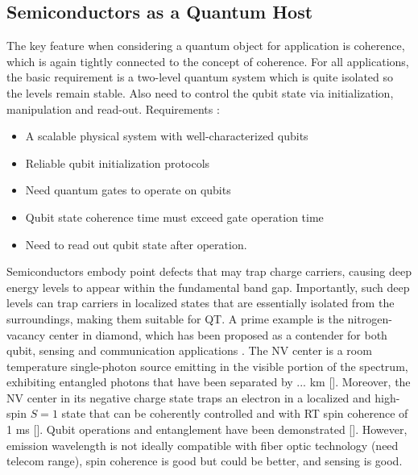 \documentclass[superscriptaddress,unsortedaddress,
 amsmath,amssymb,
 aps,
]{revtex4-2}
\begin{document}
\subsection*{Semiconductors as a Quantum Host} %
The key feature when considering a quantum object for application is coherence, which is again tightly connected to the concept of coherence. 
For all applications, the basic requirement is a two-level quantum system which is quite isolated so the levels remain stable. 
Also need to control the qubit state via initialization, manipulation and read-out. 
Requirements \cite{DiVincenzo2000,Weber2010}: 
\begin{itemize}
    \item A scalable physical system with well-characterized qubits
    \item Reliable qubit initialization protocols 
    \item Need quantum gates to operate on qubits 
    \item Qubit state coherence time must exceed gate operation time 
    \item Need to read out qubit state after operation. 
\end{itemize}

Semiconductors embody point defects that may trap charge carriers, causing deep energy levels to appear within the fundamental band gap. 
Importantly, such deep levels can trap carriers in localized states that are essentially isolated from the surroundings, making them suitable for QT. 
A prime example is the nitrogen-vacancy center in diamond, which has been proposed 
as a contender for both qubit, sensing and communication applications \cite{Doherty_2013}. 
The NV center is a room temperature single-photon source emitting in the visible portion of the spectrum, exhibiting entangled photons that have been separated by ... km []. 
Moreover, the NV center in its negative charge state traps an electron in a localized and high-spin $S=1$ state that can be coherently controlled and with RT spin coherence of 1 ms []. 
Qubit operations and entanglement have been demonstrated []. 
However, emission wavelength is not ideally compatible with fiber optic technology (need telecom range), spin coherence is good but could be better, and sensing is good. 
\end{document}
